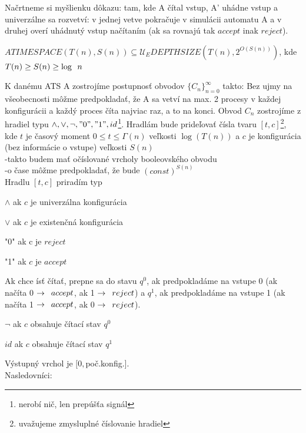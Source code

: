\begin{dokaz}
  Načrtneme si myšlienku dôkazu: tam, kde A čítal vstup, A' uhádne vstup a univerzálne sa
  rozvetví: v jednej vetve pokračuje v simulácii automatu A a v druhej overí uhádnutý vstup
  načítaním (ak sa rovnajú tak $accept$ inak $reject$).
\end{dokaz}

\begin{veta}\label{Veta4}
  $ATIMESPACE(T(n),S(n))\subseteq \mathcal{U}_E DEPTHSIZE(T(n),2^{O(S(n))})$, kde $T(n)\geq
  S(n) \geq \log\enspace n$
\end{veta}

\begin{dokaz}
  K danému ATS A zostrojíme postupnosť obvodov $\{C_n\}_{n=0}^{\infty}$ takto: Bez ujmy na
  všeobecnosti môžme predpokladať, že A sa vetví na max. 2 procesy v každej konfigurácii a
  každý proces číta najviac raz, a to na konci. Obvod $C_n$ zostrojíme z hradiel typu
  $\wedge,\vee,\neg, "0","1",id$\footnote{nerobí nič, len prepúšťa signál}. Hradlám bude
  prideľovať čísla tvaru $[t,c]$\footnote{uvažujeme zmysluplné číslovanie hradiel}, kde $t$
  je časový moment $0\leq t \leq \Gamma(n)$ veľkosti $\log(T(n))$ a $c$ je konfigurácia
  (bez informácie o vstupe) veľkosti $S(n)$\\ -takto budem mať očíslované vrcholy
  booleovského obvodu \\ -o čase môžme predpokladať, že bude $(const)^{S(n)}$\\Hradlu
  $[t,c]$ priradím typ
  \begin{description}
  \item {$\wedge$ } ak $c$ je univerzálna konfigurácia
  \item {$\vee$ } ak $c$ je existenčná konfigurácia
  \item {"0"} ak c je $reject$
  \item {"1"} ak $c$ je $accept$
  \end{description}
  Ak chce ísť čítať, prepne sa do stavu $q^0$, ak predpokladáme na vstupe 0 (ak načíta 0
  $\rightarrow \enspace accept$, ak 1 $\rightarrow \enspace reject$) a $q^1$, ak predpokladáme na
  vstupe 1 (ak načíta 1 $\rightarrow \enspace accept$, ak 0 $\rightarrow \enspace reject$).
  \begin{description}
  \item $\neg $ ak $c$ obsahuje čítací stav $q^0$
  \item $id $ ak $c$ obsahuje čítací stav $q^1$
  \end{description}
  Výstupný vrchol je $[0,$poč.konfig.$]$.\\ Nasledovníci:

\end{dokaz}
